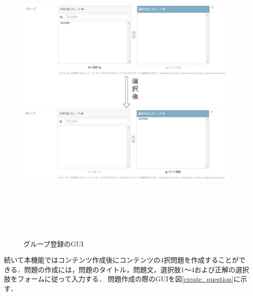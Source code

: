 \begin{figure}[htbp]
    \begin{center}
        \includegraphics[width=16cm,height=15cm,keepaspectratio]{group_register-crop.pdf}\\
    \end{center}
    \caption{グループ登録のGUI}
    \label{group_register}
\end{figure}

\newpage
続いて本機能ではコンテンツ作成後にコンテンツの4択問題を作成することができる．問題の作成には，問題のタイトル，問題文，選択肢1～4および正解の選択肢をフォームに従って入力する．
問題作成の際のGUIを図\ref{create_question}に示す．

